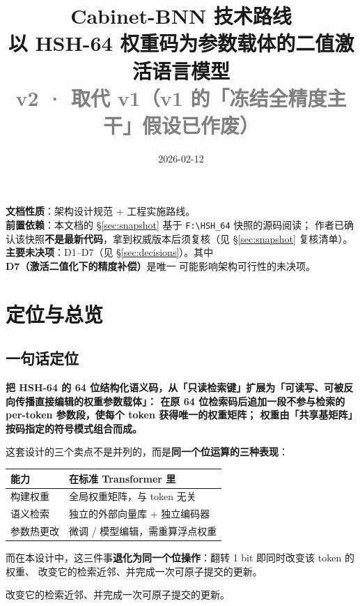 \documentclass[11pt,a4paper]{ctexart}
\title{\vspace{-1.6cm}\textbf{\color{deepblue}Cabinet-BNN 技术路线}\\[4pt]
       \large 以 HSH-64 权重码为参数载体的二值激活语言模型\\[2pt]
       \normalsize \textcolor{gray}{v2 · 取代 v1（v1 的「冻结全精度主干」假设已作废）}}
\author{}
\date{2026-02-12}
\newcommand{\keybox}[1]{%
  \begin{center}\begin{minipage}{0.94\textwidth}%
  \colorbox{graylight}{\begin{minipage}{0.92\textwidth}\vspace{3pt}#1\vspace{3pt}\end{minipage}}%
  \end{minipage}\end{center}}
\theoremstyle{definition}
\begin{document}
\maketitle
\thispagestyle{fancy}

\begin{center}
\begin{minipage}{0.92\textwidth}
\small
\textbf{文档性质}：架构设计规范 + 工程实施路线。\\
\textbf{前置依赖}：本文档的 \S\ref{sec:snapshot} 基于 \texttt{F:\textbackslash HSH\_64} 快照的源码阅读；
作者已确认该快照\textbf{不是最新代码}，拿到权威版本后须复核（见 \S\ref{sec:snapshot} 复核清单）。\\
\textbf{主要未决项}：D1--D7（见 \S\ref{sec:decisions}）。其中 \textbf{D7（激活二值化下的精度补偿）}是唯一
可能影响架构可行性的未决项。
\end{minipage}
\end{center}

\vspace{0.4cm}

\tableofcontents
\newpage

\section{定位与总览}

\subsection{一句话定位}

\keybox{%
\textbf{把 HSH-64 的 64 位结构化语义码，从「只读检索键」扩展为「可读写、可被反向传播直接编辑的权重参数载体」：
在原 64 位检索码后\textbf{追加一段不参与检索的 per-token 参数段}，使每个 token 获得唯一的权重矩阵；
权重由「共享基矩阵」按码指定的符号模式组合而成。}

这套设计的三个卖点不是并列的，而是\textbf{同一个位运算的三种表现}：

\begin{center}
\begin{tabularx}{\textwidth}{@{}lX@{}}
\toprule
\textbf{能力} & \textbf{在标准 Transformer 里} \\
\midrule
构建权重 & 全局权重矩阵，与 token 无关 \\
语义检索 & 独立的外部向量库 + 独立编码器 \\
参数热更改 & 微调 / 模型编辑，需重算浮点权重 \\
\bottomrule
\end{tabularx}
\end{center}

而在本设计中，这三件事\textbf{退化为同一个位操作}：翻转 1 bit 即同时改变该 token 的权重、
改变它的检索近邻、并完成一次可原子提交的更新。}
改变它的检索近邻、并完成一次可原子提交的更新。
\end{document}

